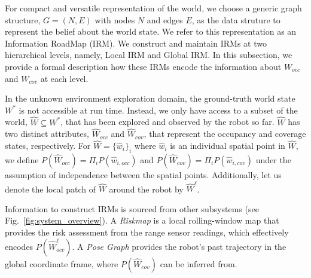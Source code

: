 \documentclass[letterpaper]{article} %
\newcommand{\phdone}[1]{} %
\begin{document}
\phdone{Data structure}
For compact and versatile representation of the world, we choose a generic graph structure, $G = (N, E)$ with nodes $N$ and edges $E$, as the data struture to represent the belief about the world state.
We refer to this representation as an Information RoadMap (IRM).
We construct and maintain IRMs at two hierarchical levels, namely, Local IRM and Global IRM.
In this subsection, we provide a formal description how these IRMs encode the information about $W_{occ}$ and $W_{cov}$ at each level.


\phdone{Formulation}
In the unknown environment exploration domain, the ground-truth world state $W^*$ is not accessible at run time.
Instead, we only have access to a subset of the world, $\hat{W} \subseteq W^*$, that has been explored and observed by the robot so far.
$\hat{W}$ has two distinct attributes, $\hat{W}_{occ}$ and $\hat{W}_{cov}$, that represent the occupancy and coverage states, respectively.
%
For $\hat{W} = \{\hat{w}_i\}_i$ where $\hat{w}_i$ is an individual spatial point in $\hat{W}$, we define $P(\hat{W}_{occ}) = \Pi_i P(\hat{w}_{i,occ})$ and $P(\hat{W}_{cov}) = \Pi_i P(\hat{w}_{i,cov})$ under the assumption of independence between the spatial points.
Additionally, let us denote the local patch of $\hat{W}$ around the robot by $\hat{W}^\ell$.
%
%


\phdone{Information Sources}
Information to construct IRMs is sourced from other subsystems (see Fig.~\ref{fig:system_overview}).
A \textit{Riskmap} is a local rolling-window map that provides the risk assessment from the range sensor readings, %
which effectively encodes $P(\hat{W}^\ell_{occ})$.
A \textit{Pose Graph} %
provides the robot's past trajectory in the global coordinate frame, where $P(\hat{W}_{cov})$ can be inferred from.
\end{document}
